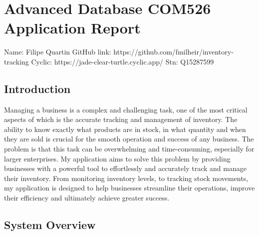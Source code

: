 \hypertarget{advanced-database-com526-application-report}{%
\section{Advanced Database COM526 Application
Report}\label{advanced-database-com526-application-report}}

Name: Filipe Quartin GitHub link:
https://github.com/fmilheir/inventory-tracking Cyclic:
https://jade-clear-turtle.cyclic.app/ Stn: Q15287599

\hypertarget{introduction}{%
\subsection{Introduction}\label{introduction}}

Managing a business is a complex and challenging task, one of the most
critical aspects of which is the accurate tracking and management of
inventory. The ability to know exactly what products are in stock, in
what quantity and when they are sold is crucial for the smooth operation
and success of any business. The problem is that this task can be
overwhelming and time-consuming, especially for larger enterprises. My
application aims to solve this problem by providing businesses with a
powerful tool to effortlessly and accurately track and manage their
inventory. From monitoring inventory levels, to tracking stock
movements, my application is designed to help businesses streamline
their operations, improve their efficiency and ultimately achieve
greater success.

\hypertarget{system-overview}{%
\subsection{System Overview}\label{system-overview}}

